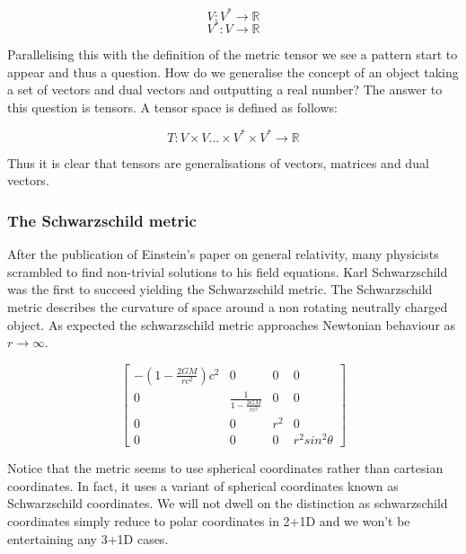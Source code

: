 \documentclass{article}
\begin{document}
  \begin{equation*}
    V: V^* \rightarrow \mathbb R
  \end{equation*}
  \begin{equation*}
    V^*: V \rightarrow \mathbb R
  \end{equation*}

Parallelising this with the definition of the metric tensor we see a pattern start to appear and thus a question. How do we generalise the concept of an object taking a set of vectors and dual vectors and outputting a real number? The answer to this question is tensors. A tensor space is defined as follows:

  \begin{equation*}
    T: V \times V... \times V^* \times V^* \rightarrow \mathbb R
  \end{equation*}

Thus it is clear that tensors are generalisations of vectors, matrices and dual vectors.

\subsubsection{The Schwarzschild metric}

After the publication of Einstein's paper on general relativity, many physicists scrambled to find non-trivial solutions to his field equations. Karl Schwarzschild was the first to succeed yielding the Schwarzschild metric. The Schwarzschild metric describes the curvature of space around a non rotating neutrally charged object. As expected the schwarzschild metric approaches Newtonian behaviour as $r \rightarrow \infty$.

\begin{equation*}
  \begin{bmatrix}
    -(1-\frac{2GM}{rc^2})c^2 & 0 & 0 & 0\\
    0 & \frac{1}{1-\frac{2GM}{rc^2}} & 0 & 0\\
    0 & 0 & r^2 & 0\\
    0 & 0 & 0 & r^2 sin^2 \theta
  \end{bmatrix}
\end{equation*}

Notice that the metric seems to use spherical coordinates rather than cartesian coordinates. In fact, it uses a variant of spherical coordinates known as Schwarzschild coordinates. We will not dwell on the distinction as schwarzschild coordinates simply reduce to polar coordinates in 2+1D and we won't be entertaining any 3+1D cases.
\end{document}

